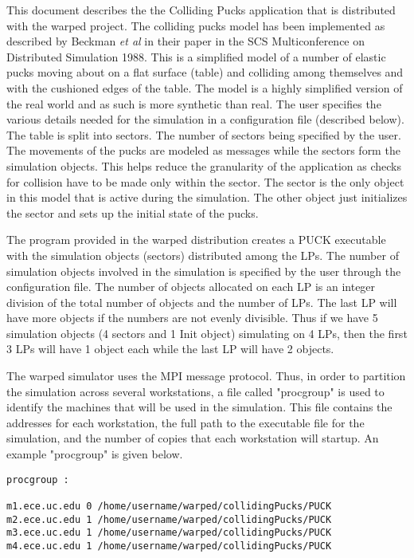 This document describes the the Colliding Pucks application that is
distributed with the {\sc warped} project. The colliding pucks model has
been implemented as described by Beckman {\it et al} in their paper in the
SCS Multiconference on Distributed Simulation 1988. This is a simplified
model of a number of elastic pucks moving about on a flat surface (table)
and colliding among themselves and with the cushioned edges of the
table. The model is a highly simplified version of the real world and as
such is more synthetic than real. The user specifies the various details
needed for the simulation in a configuration file (described below). The
table is split into sectors. The number of sectors being specified by the
user. The movements of the pucks are modeled as messages while the sectors
form the simulation objects. This helps reduce the granularity of the
application as checks for collision have to be made only within the
sector. The sector is the only object in this model that is active during
the simulation. The other object just initializes the sector and sets up
the initial state of the pucks.

The program provided in the {\sc warped} distribution creates a PUCK
executable with the simulation objects (sectors) distributed among the
LPs. The number of simulation objects involved in the simulation is
specified by the user through the configuration file. The number of
objects allocated on each LP is an integer division of the total number of
objects and the number of LPs. The last LP will have more objects if the
numbers are not evenly divisible. Thus if we have 5 simulation objects (4
sectors and 1 Init object) simulating on 4 LPs, then the first 3 LPs will
have 1 object each while the last LP will have 2 objects.

The {\sc warped} simulator uses the MPI message protocol.  Thus, in order
to partition the simulation across several workstations, a file called
"procgroup" is used to identify the machines that will be used in the
simulation.  This file contains the addresses for each workstation, the
full path to the executable file for the simulation, and the number of
copies that each workstation will startup.  An example "procgroup" is
given below.

\begin{verbatim}
procgroup :

m1.ece.uc.edu 0 /home/username/warped/collidingPucks/PUCK
m2.ece.uc.edu 1 /home/username/warped/collidingPucks/PUCK
m3.ece.uc.edu 1 /home/username/warped/collidingPucks/PUCK
m4.ece.uc.edu 1 /home/username/warped/collidingPucks/PUCK
\end{verbatim}


